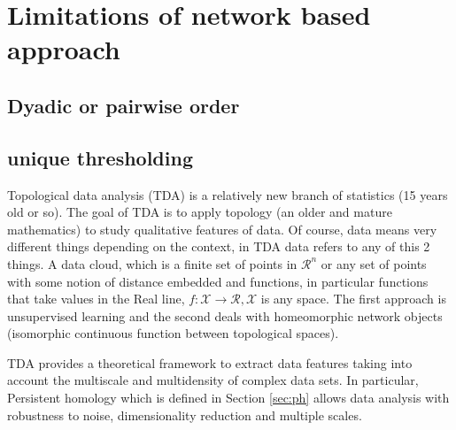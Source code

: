 \documentclass[onecollarge,runningheads]{svjour2}
\begin{document}
\section{Limitations of network based approach}
\label{se:tda}
\subsection{Dyadic or pairwise order}
\subsection{unique thresholding}

Topological data analysis (TDA) is a relatively new branch of statistics (15 years old or so). The goal of TDA is to apply topology (an older and mature mathematics) to study qualitative features of data. Of course, data means very different things depending on the context, in TDA data refers to any of this 2 things. A data cloud, which is  a finite set of points in $\mathcal{R}^n$  or any set of points with some notion of distance embedded and functions, in particular functions that take values in the Real line, $f:\mathcal{X} \to \mathcal{R}, \mathcal{X}$ is any space. The first approach is unsupervised learning and the second deals with homeomorphic  network objects (isomorphic continuous function between topological spaces). 

TDA provides a theoretical framework to extract data features taking into account the multiscale and multidensity of complex data sets. In particular, Persistent homology which is defined in Section \ref{sec:ph} allows data analysis with robustness to noise, dimensionality reduction and multiple scales. 
\end{document}
